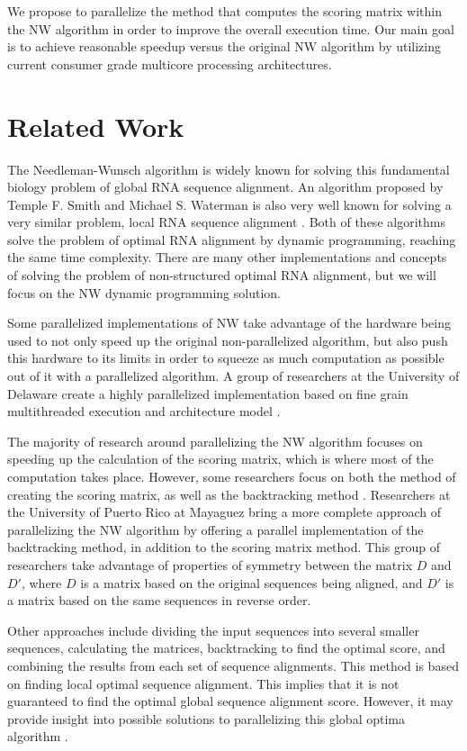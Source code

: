 \documentclass[letterpaper, 10 pt, conference]{IEEEconf}
\begin{document}
We propose to parallelize the method that computes the scoring matrix within the NW algorithm in order to improve the overall execution time. Our main goal is to achieve reasonable speedup versus the original NW algorithm by utilizing current consumer grade multicore processing architectures. 

\section{Related Work}
The Needleman-Wunsch algorithm is widely known for solving this fundamental biology problem of global RNA sequence alignment. An algorithm proposed by Temple F. Smith and Michael S. Waterman is also very well known for solving a very similar problem, local RNA sequence alignment \cite{smith_waterman_1981}. Both of these algorithms solve the problem of optimal RNA alignment by dynamic programming, reaching the same time complexity. There are many other implementations and concepts of solving the problem of non-structured optimal RNA alignment, but we will focus on the NW dynamic programming solution.

Some parallelized implementations of NW take advantage of the hardware being used to not only speed up the original non-parallelized algorithm, but also push this hardware to its limits in order to squeeze as much computation as possible out of it with a parallelized algorithm. A group of researchers at the University of Delaware create a highly parallelized implementation based on fine grain multithreaded execution and architecture model \cite{martins_2001}. 
 
The majority of research around parallelizing the NW algorithm focuses on speeding up the calculation of the scoring matrix, which is where most of the computation takes place. However, some researchers focus on both the method of creating the scoring matrix, as well as the backtracking method \cite{seguel_2011}. Researchers at the University of Puerto Rico at Mayaguez bring a more complete approach of parallelizing the NW algorithm by offering a parallel implementation of the backtracking method, in addition to the scoring matrix method. This group of researchers take advantage of properties of symmetry between the matrix $D$ and $D'$, where $D$ is a matrix based on the original sequences being aligned, and $D'$ is a matrix based on the same sequences in reverse order.

Other approaches include dividing the input sequences into several smaller sequences, calculating the matrices, backtracking to find the optimal score, and combining the results from each set of sequence alignments. This method is based on finding local optimal sequence alignment. This implies that it is not guaranteed to find the optimal global sequence alignment score. However, it may provide insight into possible solutions to parallelizing this global optima algorithm \cite{zhang_2004}.  
\end{document}
